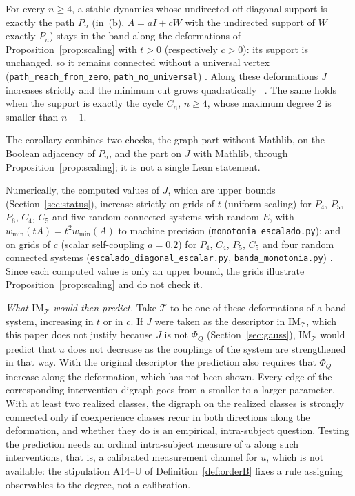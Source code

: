 \begin{corollary}\label{cor:band-scaling}
For every $n\ge4$, a stable dynamics whose undirected off-diagonal support is exactly the path $P_n$ (in~(b), $A=aI+cW$ with the undirected support of $W$ exactly $P_n$) stays in the band along the deformations of Proposition~\ref{prop:scaling} with $t>0$ (respectively $c>0$): its support is unchanged, so it remains connected without a universal vertex (\texttt{path\_reach\_from\_zero}, \texttt{path\_no\_universal}) \stL. Along these deformations $J$ increases strictly and the minimum cut grows quadratically \stA\ \stM. The same holds when the support is exactly the cycle $C_n$, $n\ge4$, whose maximum degree $2$ is smaller than $n-1$.
\end{corollary}
The corollary combines two checks, the graph part without Mathlib, on the Boolean adjacency of $P_n$, and the part on $J$ with Mathlib, through Proposition~\ref{prop:scaling}; it is not a single Lean statement.

Numerically, the computed values of $J$, which are upper bounds (Section~\ref{sec:status}), increase strictly on grids of $t$ (uniform scaling) for $P_4$, $P_5$, $P_6$, $C_4$, $C_5$ and five random connected systems with random $E$, with $w_{\min}(tA)=t^2w_{\min}(A)$ to machine precision (\texttt{monotonia\_escalado.py}); and on grids of $c$ (scalar self-coupling $a=0.2$) for $P_4$, $C_4$, $P_5$, $C_5$ and four random connected systems (\texttt{escalado\_diagonal\_escalar.py}, \texttt{banda\_monotonia.py}) \stN. Since each computed value is only an upper bound, the grids illustrate Proposition~\ref{prop:scaling} and do not check it.

\emph{What $\mathrm{IM}_{\mathcal T}$ would then predict.} Take $\mathcal T$ to be one of these deformations of a band system, increasing in $t$ or in $c$. If $J$ were taken as the descriptor in $\mathrm{IM}_{\mathcal T}$, which this paper does not justify because $J$ is not $\Phi_Q$ (Section~\ref{sec:gauss}), $\mathrm{IM}_{\mathcal T}$ would predict that $u$ does not decrease as the couplings of the system are strengthened in that way. With the original descriptor the prediction also requires that $\Phi_Q$ increase along the deformation, which has not been shown. Every edge of the corresponding intervention digraph goes from a smaller to a larger parameter. With at least two realized classes, the digraph on the realized classes is strongly connected only if coexperience classes recur in both directions along the deformation, and whether they do is an empirical, intra-subject question. Testing the prediction needs an ordinal intra-subject measure of $u$ along such interventions, that is, a calibrated measurement channel for $u$, which is not available: the stipulation A14--U of Definition~\ref{def:orderB} fixes a rule assigning observables to the degree, not a calibration.

